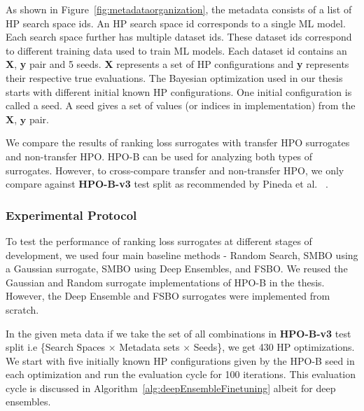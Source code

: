 \documentclass[12pt, twoside, ngerman]{report}
\begin{document}
As shown in Figure~\ref{fig:metadataorganization}, the metadata consists of a list of HP search space ids. An HP search space id corresponds to a single ML model. Each search space further has multiple dataset ids.
These dataset ids correspond to different training data used to train ML models. Each dataset id contains an \textbf{X}, \textbf{y} pair and 5 seeds. \textbf{X} represents a set of HP configurations and
\textbf{y} represents their respective true evaluations. The Bayesian optimization used in our thesis starts with different initial known HP configurations. One initial configuration is called a seed. A seed gives a set of values (or indices in implementation) from the $\textbf{X}$,  $\textbf{y}$ pair.

We compare the results of ranking loss surrogates with transfer HPO surrogates and non-transfer HPO.
HPO-B can be used for analyzing both types of surrogates.
However, to cross-compare transfer and non-transfer HPO,  we only compare against \textbf{HPO-B-v3} test split as recommended by Pineda
 et al. ~\cite{DBLP:journals/corr/abs-2106-06257}.

\subsubsection{Experimental Protocol}
To test the performance of ranking loss surrogates at different stages of development, we used four main baseline methods - Random Search,  SMBO using a Gaussian surrogate, SMBO using Deep Ensembles, and FSBO.
We reused the Gaussian and Random surrogate implementations of HPO-B in the thesis.
However, the Deep Ensemble and FSBO surrogates were implemented from scratch.

In the given meta data if we take the set of all combinations in \textbf{HPO-B-v3} test split i.e \{Search Spaces $\times$ Metadata sets $\times$ Seeds\}, we get 430 HP optimizations.
We start with five initially known HP configurations given by the HPO-B seed in each optimization and run the evaluation cycle for 100 iterations.
This evaluation cycle is discussed in Algorithm~\ref{alg:deepEnsembleFinetuning} albeit for deep ensembles.
\end{document}
